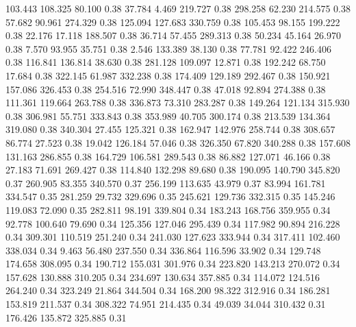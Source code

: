  103.443  108.325   80.100         0.38
  37.784    4.469  219.727         0.38
 298.258   62.230  214.575         0.38
  57.682   90.961  274.329         0.38
 125.094  127.683  330.759         0.38
 105.453   98.155  199.222         0.38
  22.176   17.118  188.507         0.38
  36.714   57.455  289.313         0.38
  50.234   45.164   26.970         0.38
   7.570   93.955   35.751         0.38
   2.546  133.389   38.130         0.38
  77.781   92.422  246.406         0.38
 116.841  136.814   38.630         0.38
 281.128  109.097   12.871         0.38
 192.242   68.750   17.684         0.38
 322.145   61.987  332.238         0.38
 174.409  129.189  292.467         0.38
 150.921  157.086  326.453         0.38
 254.516   72.990  348.447         0.38
  47.018   92.894  274.388         0.38
 111.361  119.664  263.788         0.38
 336.873   73.310  283.287         0.38
 149.264  121.134  315.930         0.38
 306.981   55.751  333.843         0.38
 353.989   40.705  300.174         0.38
 213.539  134.364  319.080         0.38
 340.304   27.455  125.321         0.38
 162.947  142.976  258.744         0.38
 308.657   86.774   27.523         0.38
  19.042  126.184   57.046         0.38
 326.350   67.820  340.288         0.38
 157.608  131.163  286.855         0.38
 164.729  106.581  289.543         0.38
  86.882  127.071   46.166         0.38
  27.183   71.691  269.427         0.38
 114.840  132.298   89.680         0.38
 190.095  140.790  345.820         0.37
 260.905   83.355  340.570         0.37
 256.199  113.635   43.979         0.37
  83.994  161.781  334.547         0.35
 281.259   29.732  329.696         0.35
 245.621  129.736  332.315         0.35
 145.246  119.083   72.090         0.35
 282.811   98.191  339.804         0.34
 183.243  168.756  359.955         0.34
  92.778  100.640   79.690         0.34
 125.356  127.046  295.439         0.34
 117.982   90.894  216.228         0.34
 309.301  110.519  251.240         0.34
 241.030  127.623  333.944         0.34
 317.411  102.460  338.034         0.34
   9.463   56.480  237.550         0.34
 336.864  116.596   33.902         0.34
 129.748  174.658  308.095         0.34
 190.712  155.031  301.976         0.34
 223.820  143.213  270.072         0.34
 157.628  130.888  310.205         0.34
 234.697  130.634  357.885         0.34
 114.072  124.516  264.240         0.34
 323.249   21.864  344.504         0.34
 168.200   98.322  312.916         0.34
 186.281  153.819  211.537         0.34
 308.322   74.951  214.435         0.34
  49.039   34.044  310.432         0.31
 176.426  135.872  325.885         0.31
